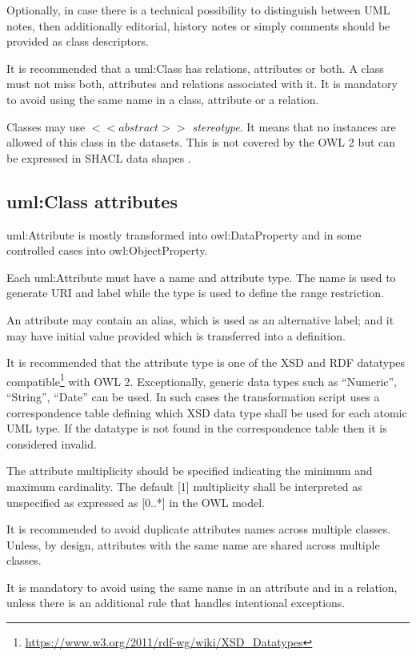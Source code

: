 	Optionally, in case there is a technical possibility to distinguish between UML notes, then additionally editorial, history notes or simply comments should be provided as class descriptors.
	
	It is recommended that a uml:Class has relations, attributes or both. A class must not miss both, attributes and relations associated with it. 
	It is mandatory to avoid using the same name in a class, attribute or a relation. 
	
	Classes may use\textit{ $<<abstract>>$ stereotype}. It means that no instances are allowed of this class in the datasets. This is not covered by the OWL 2 \cite{owl2} but can be expressed in SHACL data shapes \cite{shacl-spec}. 
	
	\subsection{uml:Class attributes}
	\label{sec:attributes-class}
	
	uml:Attribute is mostly transformed into owl:DataProperty and in some controlled cases into owl:ObjectProperty.
	
	Each uml:Attribute must have a name and attribute type. The name is used to generate URI and label while the type is used to define the range restriction. 
	
	An attribute may contain an alias, which is used as an alternative label; and it may have initial value provided which is transferred into a definition.  	
	
	It is recommended that the attribute type is one of the XSD and RDF datatypes compatible\footnote{\url{https://www.w3.org/2011/rdf-wg/wiki/XSD_Datatypes}} with OWL 2. Exceptionally, generic data types such as ``Numeric'', ``String'', ``Date'' can be used. In such cases the transformation script uses a correspondence table defining which XSD data type shall be used for each atomic UML type. If the datatype is not found in the correspondence table then it is considered invalid. 
	
	The attribute multiplicity should be specified indicating the minimum and maximum cardinality. The default [1] multiplicity shall be interpreted as unspecified as expressed as [0..*] in the OWL model.
	
	It is recommended to avoid duplicate attributes names across multiple classes. Unless, by design, attributes with the same name are shared across multiple classes. 
	
	It is mandatory to avoid using the same name in an attribute and in a relation, unless there is an additional rule that handles intentional exceptions.  
	
